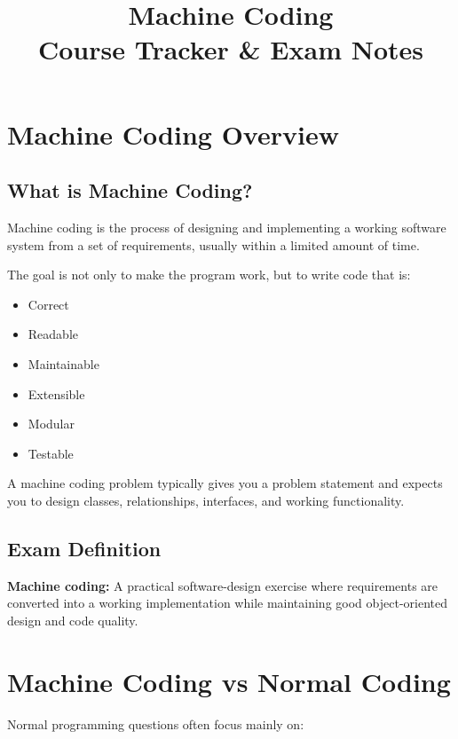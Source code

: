 \documentclass[12pt,a4paper]{article}
\title{\textbf{Machine Coding}\\
\large Course Tracker \& Exam Notes}
\author{}
\date{}
\begin{document}
\maketitle
\tableofcontents
\newpage

\section{Machine Coding Overview}

\subsection{What is Machine Coding?}

Machine coding is the process of designing and implementing a working software system from a set of requirements, usually within a limited amount of time.

The goal is not only to make the program work, but to write code that is:

\begin{itemize}
    \item Correct
    \item Readable
    \item Maintainable
    \item Extensible
    \item Modular
    \item Testable
\end{itemize}

A machine coding problem typically gives you a problem statement and expects you to design classes, relationships, interfaces, and working functionality.

\subsection{Exam Definition}

\textbf{Machine coding:} A practical software-design exercise where requirements are converted into a working implementation while maintaining good object-oriented design and code quality.

\section{Machine Coding vs Normal Coding}

Normal programming questions often focus mainly on:
\end{document}
